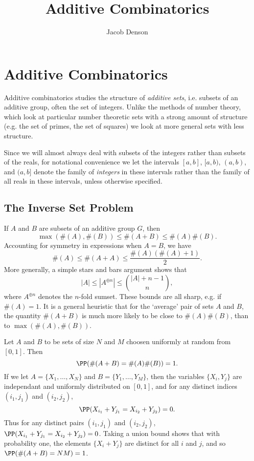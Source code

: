 

\title{Additive Combinatorics}
\author{Jacob Denson}




\maketitle

\tableofcontents


\chapter{Additive Combinatorics}

Additive combinatorics studies the structure of \emph{additive sets}, i.e. subsets of an additive group, often the set of integers. Unlike the methods of number theory, which look at particular number theoretic sets with a strong amount of structure (e.g. the set of primes, the set of squares) we look at more general sets with less structure.

Since we will almost always deal with subsets of the integers rather than subsets of the reals, for notational convenience we let the intervals $[a,b]$, $[a,b)$, $(a,b)$, and $(a,b]$ denote the family of \emph{integers} in these intervals rather than the family of all reals in these intervals, unless otherwise specified.

\section{The Inverse Set Problem}

If $A$ and $B$ are subsets of an additive group $G$, then
%
\[ \max(\#(A),\#(B)) \leq \#(A + B) \leq \#(A) \#(B). \]
%
Accounting for symmetry in expressions when $A = B$, we have
%
\[ \#(A) \leq \#(A + A) \leq \frac{\#(A) (\#(A) + 1)}{2}. \]
%
More generally, a simple stars and bars argument shows that
%
\[ |A| \leq |A^{\oplus n}| \leq {{|A| + n - 1}\choose{n}}, \]
%
where $A^{\oplus n}$ denotes the $n$-fold sumset. These bounds are all sharp, e.g. if $\#(A) = 1$. It is a general heuristic that for the `average' pair of sets $A$ and $B$, the quantity $\#(A + B)$ is much more likely to be close to $\#(A) \#(B)$, than to $\max(\#(A),\#(B))$.

\begin{example}
    Let $A$ and $B$ to be sets of size $N$ and $M$ choosen uniformly at random from $[0,1]$. Then
    \[ \PP(\#(A + B) = \#(A) \#(B)) = 1. \]
    If we let $A = \{ X_1,\dots, X_N \}$ and $B = \{ Y_1, \dots, Y_M \}$, then the variables $\{ X_i, Y_j \}$ are independant and uniformly distributed on $[0,1]$, and for any distinct indices $(i_1,j_1)$ and $(i_2,j_2)$,
    \[ \PP(X_{i_1} + Y_{j_1} = X_{i_2} + Y_{j_2}) = 0. \]
    Thus for any distinct pairs $(i_1,j_1)$ and $(i_2,j_2)$, $\PP(X_{i_1} + Y_{j_1} = X_{i_2} + Y_{j_2}) = 0$. Taking a union bound shows that with probability one, the elements $\{ X_i + Y_j \}$ are distinct for all $i$ and $j$, and so $\PP(\#(A + B) = NM) = 1$.
\end{example}

